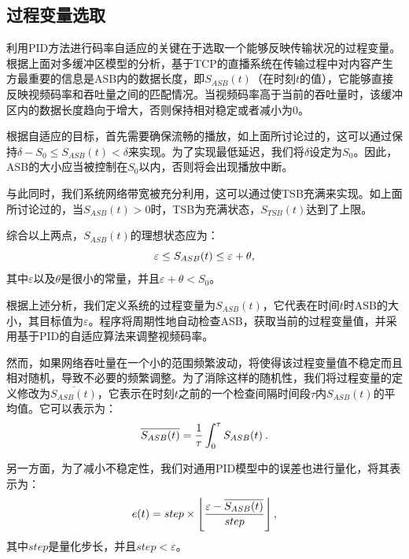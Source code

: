 \subsection{过程变量选取}

利用PID方法进行码率自适应的关键在于选取一个能够反映传输状况的过程变量。根据上面对多缓冲区模型的分析，基于TCP的直播系统在传输过程中对内容产生方最重要的信息是ASB内的数据长度，即$S_{ASB}(t)$（在时刻$t$的值），它能够直接反映视频码率和吞吐量之间的匹配情况。当视频码率高于当前的吞吐量时，该缓冲区内的数据长度趋向于增大，否则保持相对稳定或者减小为0。

根据自适应的目标，首先需要确保流畅的播放，如上面所讨论过的，这可以通过保持$\delta - S_0 \le S_{ASB}(t) < \delta$来实现。为了实现最低延迟，我们将$\delta$设定为$S_0$。因此，ASB的大小应当被控制在$S_0$以内，否则将会出现播放中断。

与此同时，我们系统网络带宽被充分利用，这可以通过使TSB充满来实现。如上面所讨论过的，当$S_{ASB}(t)>0$时，TSB为充满状态，$S_{TSB}(t)$达到了上限。

综合以上两点，$S_{ASB}(t)$的理想状态应为：
\vspace{10pt}
\begin{equation}
\vspace{10pt}
\varepsilon \le S_{ASB}(t) \le \varepsilon+\theta,
\end{equation}
其中$\varepsilon$以及$\theta$是很小的常量，并且$\varepsilon+\theta<S_0$。

根据上述分析，我们定义系统的过程变量为$S_{ASB}(t)$，它代表在时间$t$时ASB的大小，其目标值为$\varepsilon$。程序将周期性地自动检查ASB，获取当前的过程变量值，并采用基于PID的自适应算法来调整视频码率。

然而，如果网络吞吐量在一个小的范围频繁波动，将使得该过程变量值不稳定而且相对随机，导致不必要的频繁调整。为了消除这样的随机性，我们将过程变量的定义修改为$\overline{S_{ASB}(t)}$，它表示在时刻$t$之前的一个检查间隔时间段$\tau$内$S_{ASB}(t)$的平均值。它可以表示为：
\vspace{10pt}
\begin{equation}
\vspace{10pt}
\label{eq:asb}
\overline{S_{ASB}(t)} = \dfrac{1}{\tau} \int_0^\tau {S_{ASB}(t)}\: .
\end{equation}

另一方面，为了减小不稳定性，我们对通用PID模型中的误差也进行量化，将其表示为：
\vspace{10pt}
\begin{equation}
\vspace{10pt}
e(t) = step \times \left \lfloor\dfrac{\varepsilon - \overline{S_{ASB}(t)}}{step} \right \rfloor,
\end{equation}
其中$step$是量化步长，并且$step<\varepsilon$。

